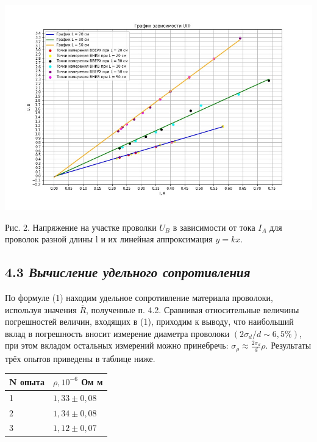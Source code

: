 \begin{center}
    {\includegraphics[width=14cm]{schedule}}
\end{center}

Рис. 2. Напряжение на участке проволки $U_B$ в зависимости от тока $I_A$ для проволок разной длины l и их линейная аппроксимация $y=kx$.\\




\subsection*{4.3 \textit{Вычисление удельного сопротивления}}




По формуле (1) находим удельное сопротивление материала проволоки, используя значения $\overline{R}$, полученные п. 4.2. Сравнивая относительные величины погрешностей величин, входящих в (1), приходим к выводу, что наибольший вклад в погрешность вносит измерение диаметра проволоки $(2\sigma_{d}/d \sim 6,5\%)$, при этом вкладом остальных измерений можно принебречь: $\sigma_{\rho} \approx \frac{2\sigma_{d}}{d}\rho$. Результаты трёх опытов приведены в таблице ниже.


\begin{table}[h]
\centering
\begin{tabular}{|l|l|}
\hline
N опыта & $\rho, 10^{-6}$ Ом м   \\ \hline
1       & $1,33 \pm 0,08$                         \\ \hline
2       & $1,34 \pm 0,08$                         \\ \hline
3       & $1,12 \pm 0,07$                         \\ \hline
\end{tabular}
\end{table}


